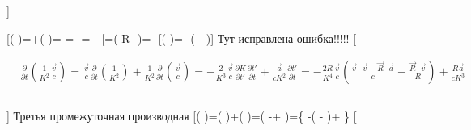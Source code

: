 \documentclass[11pt]{article}
\begin{document}
{]}

{[}\left(
\right)=+\left(
\right)=-=--=--\frac{\partial K}{\partial t'}{]}
{[}=\left(
R-
\right)=-\frac{\overrightarrow{R}\cdot \overrightarrow{v}}{R}{]}
{[}\left(
\right)=--\left(
-
\right){]} Тут исправлена ошибка!!!!! {[}

\begin{align}
  & \frac{\partial }{\partial t}\left( \frac{1}{{{K}^{2}}}\frac{\overrightarrow{v}}{c} \right)=\frac{\overrightarrow{v}}{c}\frac{\partial }{\partial t}\left( \frac{1}{{{K}^{2}}} \right)+\frac{1}{{{K}^{2}}}\frac{\partial }{\partial t}\left( \frac{\overrightarrow{v}}{c} \right)=-\frac{2}{{{K}^{3}}}\frac{\overrightarrow{v}}{c}\frac{\partial K}{\partial t'}\frac{\partial t'}{\partial t}+\frac{\overrightarrow{a}}{c{{K}^{2}}}\frac{\partial t'}{\partial t}=-\frac{2R}{{{K}^{4}}}\frac{\overrightarrow{v}}{c}\left( \frac{\overrightarrow{v}\cdot \overrightarrow{v}-\overrightarrow{R}\cdot \overrightarrow{a}}{c}-\frac{\overrightarrow{R}\cdot \overrightarrow{v}}{R} \right)+\frac{R\overrightarrow{a}}{c{{K}^{3}}} \\ 
 &  \\ 
\end{align}

{]} Третья промежуточная производная
{[}\left(
\right)=\left(
\right)+\left(
 \right)=\left(
-+
\right)=\left\{
-\left(
-
\right)+
\right\}\frac{R}{{{R}^{*}}}{]} {[}
\end{document}
